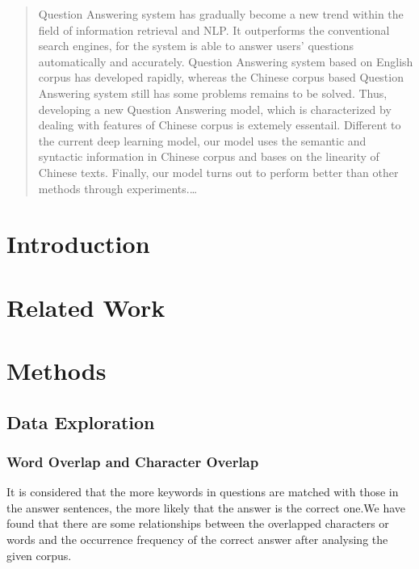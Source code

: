 \documentclass{llncs}
\begin{document}
\maketitle              %

\begin{abstract}
Question Answering system has gradually become a new trend within the field of information retrieval and NLP. It outperforms the conventional search engines, for the system is able to answer users’ questions automatically and accurately. Question Answering system based on English corpus has developed rapidly, whereas the Chinese corpus based Question Answering system still has some problems remains to be solved. Thus, developing a new Question Answering model, which is characterized by dealing with features of Chinese corpus is extemely essentail. Different to the current deep learning model, our model uses the semantic and syntactic information in Chinese corpus and bases on the linearity of Chinese texts. Finally, our model turns out to perform better than other methods through experiments.\dots
{}
\end{abstract}
%
\section{Introduction}
%


\section{Related Work}

\section{Methods}


\subsection{Data Exploration}

\subsubsection{Word Overlap and Character Overlap}
It is considered that the more keywords in questions are matched with those in the answer sentences, the more likely that the answer is the correct one.We have found that there are some relationships between the overlapped characters or words and the occurrence frequency of the correct answer after analysing the given corpus.
\end{document}
